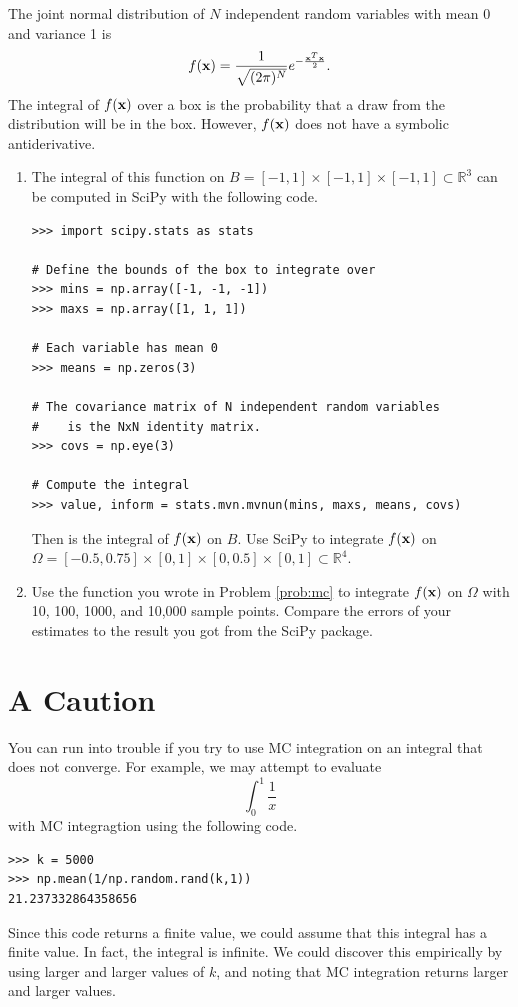 \begin{problem}
The joint normal distribution of $N$ independent random variables with mean 0 and variance 1 is
\[
f({\bf x}) = \frac{1}{\sqrt{(2 \pi)^N}} e^{- \frac{{\bf x}^T{\bf x}}{2}}.
\]
The integral of $f({\bf x})$ over a box is the probability that a draw from the distribution will be in the box.
However, $f({\bf x})$ does not have a symbolic antiderivative.
\begin{enumerate}
\item The integral of this function on $B = [-1,1]\times [-1,1]\times[-1,1] \subset \mathbb{R}^3$ can be computed in SciPy with the following code.
\begin{lstlisting}
>>> import scipy.stats as stats

# Define the bounds of the box to integrate over
>>> mins = np.array([-1, -1, -1])
>>> maxs = np.array([1, 1, 1])

# Each variable has mean 0
>>> means = np.zeros(3)

# The covariance matrix of N independent random variables
#    is the NxN identity matrix.
>>> covs = np.eye(3)

# Compute the integral
>>> value, inform = stats.mvn.mvnun(mins, maxs, means, covs)
\end{lstlisting}
Then  is the integral of $f({\bf x})$ on $B$.
Use SciPy to integrate $f({\bf x})$ on $\Omega=[-0.5, 0.75]\times[0,1]\times[0, 0.5]\times[0,1] \subset \mathbb{R}^4$.

\item Use the function  you wrote in Problem \ref{prob:mc} to integrate $f({\bf x})$ on $\Omega$ with 10, 100, 1000, and 10,000 sample points. 
Compare the errors of your estimates to the result you got from the SciPy package.
\end{enumerate}
\end{problem}


\section*{A Caution}
You can run into trouble if you try to use MC integration on an integral that does not converge.
For example, we may attempt to evaluate
\[
\int_0^1 \frac{1}{x}
\]
with MC integragtion using the following code.
\begin{lstlisting}
>>> k = 5000
>>> np.mean(1/np.random.rand(k,1))
21.237332864358656
\end{lstlisting}

Since this code returns a finite value, we could assume that this integral has a finite value.
In fact, the integral is infinite.
We could discover this empirically by using larger and larger values of $k$, and noting that MC integration returns larger and larger values.

